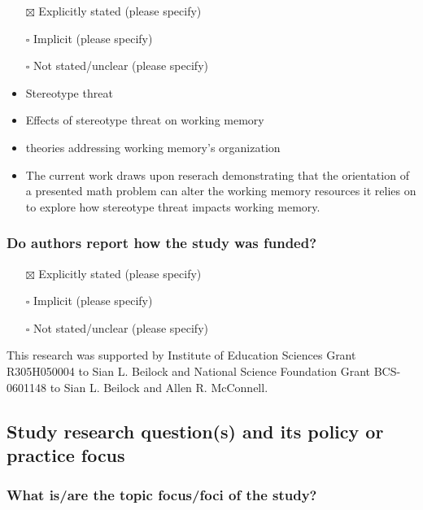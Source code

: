 \documentclass[
  doc, a4paper]{apa7}
\providecommand{\tightlist}{%
  \setlength{\itemsep}{0pt}\setlength{\parskip}{0pt}}
\begin{document}
\begin{itemize}
\item[$\boxtimes$]
  Explicitly stated (please specify)\\
\item[$\square$]
  Implicit (please specify)\\
\item[$\square$]
  Not stated/unclear (please specify)
\item
  Stereotype threat
\item
  Effects of stereotype threat on working memory\\
\item
  theories addressing working memory's organization
\item
  The current work draws upon reserach demonstrating that the orientation of a presented math problem can alter the working memory resources it relies on to explore how stereotype threat impacts working memory.
\end{itemize}

\subsubsection{Do authors report how the study was funded?}\label{do-authors-report-how-the-study-was-funded}

\begin{itemize}
\tightlist
\item[$\boxtimes$]
  Explicitly stated (please specify)\\
\item[$\square$]
  Implicit (please specify)\\
\item[$\square$]
  Not stated/unclear (please specify)
\end{itemize}

This research was supported by Institute of Education Sciences Grant R305H050004 to Sian L. Beilock and National Science Foundation Grant BCS-0601148 to Sian L. Beilock and Allen R. McConnell.

\subsection{Study research question(s) and its policy or practice focus}\label{study-research-questions-and-its-policy-or-practice-focus}

\subsubsection{What is/are the topic focus/foci of the study?}\label{what-isare-the-topic-focusfoci-of-the-study}
\end{document}
